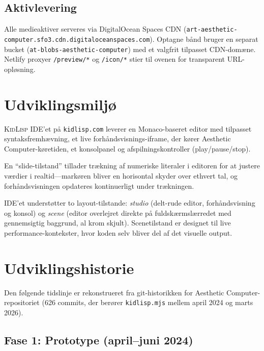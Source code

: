 \documentclass[10pt,letterpaper,twocolumn]{article}
\newcommand{\kidlisp}{\textsc{KidLisp}}
\begin{document}
\subsection{Aktivlevering}

Alle medieaktiver serveres via DigitalOcean Spaces CDN (\texttt{art-aesthetic-computer.sfo3.cdn.\allowbreak digitaloceanspaces.com}). Optagne bånd bruger en separat bucket (\texttt{at-blobs-aesthetic-computer}) med et valgfrit tilpasset CDN-domæne. Netlify proxyer \texttt{/preview/*} og \texttt{/icon/*} stier til ovenen for transparent URL-opløsning.


\section{Udviklingsmiljø}

\kidlisp{} IDE'et på \texttt{kidlisp.com} leverer en Monaco-baseret editor med tilpasset syntaksfremhævning, et live forhåndsvisnings-iframe, der kører Aesthetic Computer-køretiden, et konsolpanel og afspilningskontroller (play/pause/stop).

En ``slide-tilstand'' tillader trækning af numeriske literaler i editoren for at justere værdier i realtid---markøren bliver en horisontal skyder over ethvert tal, og forhåndsvisningen opdateres kontinuerligt under trækningen.

IDE'et understøtter to layout-tilstande: \emph{studio} (delt-rude editor, forhåndsvisning og konsol) og \emph{scene} (editor overlejret direkte på fuldskærmslærredet med gennemsigtig baggrund, al krom skjult). Scenetilstand er designet til live performance-kontekster, hvor koden selv bliver del af det visuelle output.


\section{Udviklingshistorie}
\label{sec:history}

Den følgende tidslinje er rekonstrueret fra git-historikken for Aesthetic Computer-repositoriet (626 commits, der berører \texttt{kidlisp.mjs} mellem april 2024 og marts 2026).

\subsection{Fase 1: Prototype (april--juni 2024)}
\end{document}
